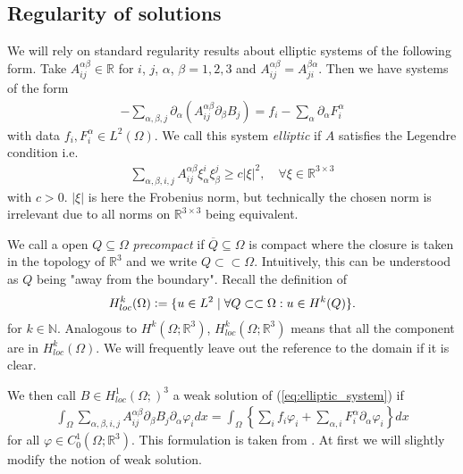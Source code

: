 \documentclass[12pt,a4paper]{article}
\numberwithin{equation}{subsection}
\numberwithin{lemma}{subsection}
\theoremstyle{definition}
\newcommand{\naturalnum}{\mathbb{N}}
\newcommand{\real}{\mathbb{R}}
\begin{document}
\subsection{Regularity of solutions}\label{sec:regularity_of_solutions}

We will rely on standard regularity results about elliptic systems 
of the following form. Take $A_{ij}^{\alpha \beta} \in \real$
for $i$, $j$, $\alpha$, $\beta = 1,2,3$ and 
$A_{ij}^{\alpha \beta} = A_{ji}^{\beta \alpha}$. Then we have systems of the 
form 
\begin{align}
    -\sum\limits_{\alpha, \beta, j} \partial_\alpha 
        (A_{ij}^{\alpha \beta} \partial_\beta B_j)
    = f_i - \sum\limits_\alpha \partial_\alpha F_i^\alpha
    \label{eq:elliptic_system}
\end{align}
with data $f_i, F_i^\alpha \in L^2(\Omega)$. We call this system 
\textit{elliptic} if $A$ satisfies the Legendre condition i.e.
\begin{align}
    \sum_{\alpha,\beta,i,j}A_{ij}^{\alpha \beta} \xi_\alpha^i \xi_\beta^j
    \geq c |\xi|^2, \quad \forall \xi \in \real^{3 \times 3} 
    \label{eq:legendre_condition}
\end{align}
with $c > 0$. $|\xi|$ is here the Frobenius norm, but technically the chosen 
norm is irrelevant due to all norms on $\real^{3 \times 3}$ being equivalent.

We call a open $Q \subseteq \Omega$ \textit{precompact} if 
$\overline{Q} \subseteq \Omega$ is compact where the closure is taken in the topology of $\real^3$
and we write $Q \subset\subset \Omega$. Intuitively, this can be understood as 
$Q$ being "away from the boundary".
Recall the definition of 
\begin{align*}
    H^k_{loc}(\Omega) \vcentcolon= \{ u\in L^2 
        \mid \forall Q\subset\subset \Omega: u \in H^k(Q) \}.
\end{align*}
for $k \in \naturalnum$.
Analogous to $H^k(\Omega;\real^3)$, $H^k_{loc}(\Omega;\real^3)$ means that 
all the component are in $H^k_{loc}(\Omega)$. We will frequently leave out the 
reference to the domain if it is clear.

We then call $B \in H^1_{loc}(\Omega;)^3$ a weak solution
of (\ref{eq:elliptic_system}) if 
\begin{align}
    \int_\Omega \sum\limits_{\alpha,\beta,i,j} 
        A_{ij}^{\alpha \beta} \partial_\beta B_j \partial_\alpha \varphi_i dx
    = \int_\Omega \left\{ \sum\limits_i f_i \varphi_i + 
        \sum\limits_{\alpha,i} F_i^\alpha \partial_\alpha \varphi_i \right\} dx
    \label{eq:weak_elliptic_system}
\end{align}
for all $\varphi \in C^1_0(\Omega;\real^3)$. This formulation is taken from 
\cite[Sec. 1.3]{lectures_on_elliptic_pdes}. At first we will slightly modify
the notion of weak solution. 
\end{document}
